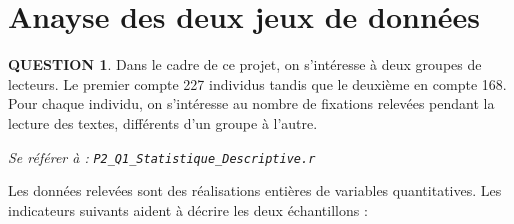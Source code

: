 \documentclass[a4paper,11pt]{article}
\newcommand{\quest}[1]{\small\textbf{#1}\normalsize}
\theoremstyle{nonumberplain}
\theoremstyle{nonumberplain}
\theoremstyle{nonumberplain}
\theoremstyle{nonumberplain}
\begin{document}
    \newpage
    \section{Anayse des deux jeux de données}

      \quest{QUESTION 1}. Dans le cadre de ce projet, on s'intéresse à deux groupes de lecteurs.
      Le premier compte 227 individus tandis que le deuxième en compte 168. Pour chaque individu, on
      s'intéresse au nombre de fixations relevées pendant la lecture des textes, différents d'un groupe à l'autre.

      \begin{ref_r}
          \emph{Se référer à :} \texttt{\emph{P2\_Q1\_Statistique\_Descriptive.r}}
      \end{ref_r}

      Les données relevées sont des réalisations entières de variables quantitatives.
      Les indicateurs suivants aident à décrire les deux échantillons :
\end{document}
